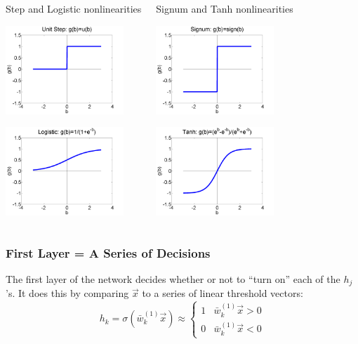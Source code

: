 \documentclass{beamer}
\begin{document}
\begin{frame}
  \begin{columns}[t]
    \column{2.25in}
    \begin{block}{Step and Logistic nonlinearities}
      \centerline{\includegraphics[width=1.75in]{figs/nn_unitstep.png}}
      \centerline{\includegraphics[width=1.75in]{figs/nn_logistic.png}}
    \end{block}
    \column{2.25in}
    \begin{block}{Signum and Tanh nonlinearities}
      \centerline{\includegraphics[width=1.75in]{figs/nn_signum.png}}
      \centerline{\includegraphics[width=1.75in]{figs/nn_tanh.png}}
    \end{block}
  \end{columns}
\end{frame}

\begin{frame}
  \frametitle{First Layer = A Series of Decisions}

  The first layer of the network decides whether or not to ``turn on'' each of the
  $h_j$'s.  It does this by comparing $\vec{x}$ to a series of linear threshold vectors:
  \[
  h_k = \sigma\left(\bar{w}_k^{(1)}\vec{x}\right)\approx\begin{cases}
  1 & \bar{w}_k^{(1)}\vec{x} > 0\\
  0 & \bar{w}_k^{(1)}\vec{x} < 0
  \end{cases}
  \]
\end{frame}
\end{document}
